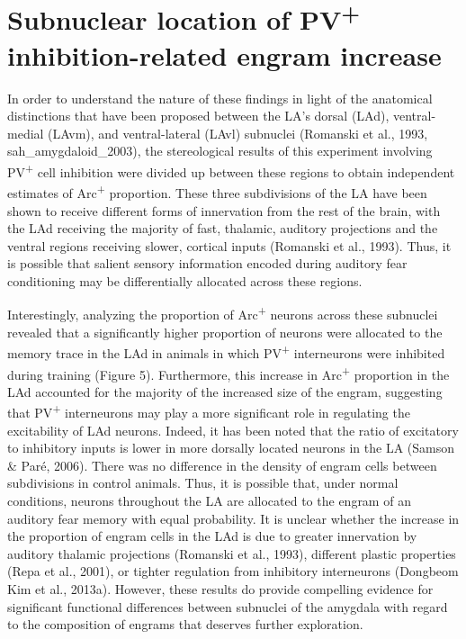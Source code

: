 \documentclass[12pt,a4paperpaper,]{report}
\begin{document}
\section{\texorpdfstring{Subnuclear location of PV\textsuperscript{+}
inhibition-related engram
increase}{Subnuclear location of PV+ inhibition-related engram increase}}\label{subnuclear-location-of-pv-inhibition-related-engram-increase}

In order to understand the nature of these findings in light of the
anatomical distinctions that have been proposed between the LA's dorsal
(LAd), ventral-medial (LAvm), and ventral-lateral (LAvl) subnuclei
(Romanski et al., 1993, sah\_amygdaloid\_2003), the stereological
results of this experiment involving PV\textsuperscript{+} cell
inhibition were divided up between these regions to obtain independent
estimates of Arc\textsuperscript{+} proportion. These three subdivisions
of the LA have been shown to receive different forms of innervation from
the rest of the brain, with the LAd receiving the majority of fast,
thalamic, auditory projections and the ventral regions receiving slower,
cortical inputs (Romanski et al., 1993). Thus, it is possible that
salient sensory information encoded during auditory fear conditioning
may be differentially allocated across these regions.

Interestingly, analyzing the proportion of Arc\textsuperscript{+}
neurons across these subnuclei revealed that a significantly higher
proportion of neurons were allocated to the memory trace in the LAd in
animals in which PV\textsuperscript{+} interneurons were inhibited
during training (Figure 5). Furthermore, this increase in
Arc\textsuperscript{+} proportion in the LAd accounted for the majority
of the increased size of the engram, suggesting that
PV\textsuperscript{+} interneurons may play a more significant role in
regulating the excitability of LAd neurons. Indeed, it has been noted
that the ratio of excitatory to inhibitory inputs is lower in more
dorsally located neurons in the LA (Samson \& Paré, 2006). There was no
difference in the density of engram cells between subdivisions in
control animals. Thus, it is possible that, under normal conditions,
neurons throughout the LA are allocated to the engram of an auditory
fear memory with equal probability. It is unclear whether the increase
in the proportion of engram cells in the LAd is due to greater
innervation by auditory thalamic projections (Romanski et al., 1993),
different plastic properties (Repa et al., 2001), or tighter regulation
from inhibitory interneurons (Dongbeom Kim et al., 2013a). However,
these results do provide compelling evidence for significant functional
differences between subnuclei of the amygdala with regard to the
composition of engrams that deserves further exploration.
\end{document}
